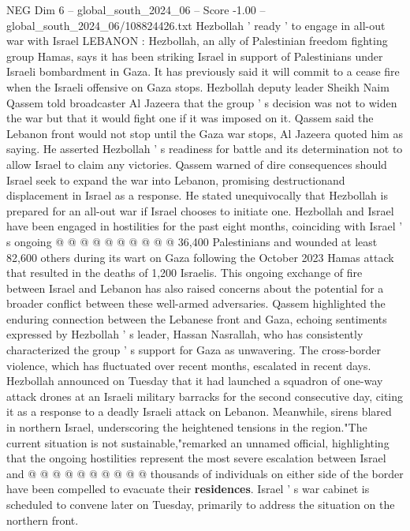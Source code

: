\begin{textsample}{NEG Dim 6 – global\_south\_2024\_06 – Score -1.00 – global\_south\_2024\_06/108824426.txt}  \label{ex:f6_neg_300}
Hezbollah ' ready ' to engage in all-out war with Israel LEBANON : Hezbollah, an ally of Palestinian freedom fighting group Hamas, says it has been striking Israel in support of Palestinians under Israeli bombardment in Gaza.
It has previously said it will commit to a cease fire when the Israeli offensive on Gaza stops.
Hezbollah deputy leader Sheikh Naim Qassem told broadcaster Al Jazeera that the group ' s decision was not to widen the war but that it would fight one if it was imposed on it.
Qassem said the Lebanon front would not stop until the Gaza war stops, Al Jazeera quoted him as saying.
He asserted Hezbollah ' s readiness for battle and its determination not to allow Israel to claim any victories.
Qassem warned of dire consequences should Israel seek to expand the war into Lebanon, promising destructionand displacement in Israel as a response.
He stated unequivocally that Hezbollah is prepared for an all-out war if Israel chooses to initiate one.
Hezbollah and Israel have been engaged in hostilities for the past eight months, coinciding with Israel ' s ongoing @ @ @ @ @ @ @ @ @ @ 36,400 Palestinians and wounded at least 82,600 others during its wart on Gaza following the October 2023 Hamas attack that resulted in the deaths of 1,200 Israelis.
This ongoing exchange of fire between Israel and Lebanon has also raised concerns about the potential for a broader conflict between these well-armed adversaries.
Qassem highlighted the enduring connection between the Lebanese front and Gaza, echoing sentiments expressed by Hezbollah ' s leader, Hassan Nasrallah, who has consistently characterized the group ' s support for Gaza as unwavering.
The cross-border violence, which has fluctuated over recent months, escalated in recent days.
Hezbollah announced on Tuesday that it had launched a squadron of one-way attack drones at an Israeli military barracks for the second consecutive day, citing it as a response to a deadly Israeli attack on Lebanon.
Meanwhile, sirens blared in northern Israel, underscoring the heightened tensions in the region."The current situation is not sustainable,"remarked an unnamed official, highlighting that the ongoing hostilities represent the most severe escalation between Israel and @ @ @ @ @ @ @ @ @ @ thousands of individuals on either side of the border have been compelled to evacuate their \textbf{residences}.
Israel ' s war cabinet is scheduled to convene later on Tuesday, primarily to address the situation on the northern front.

\end{textsample}
